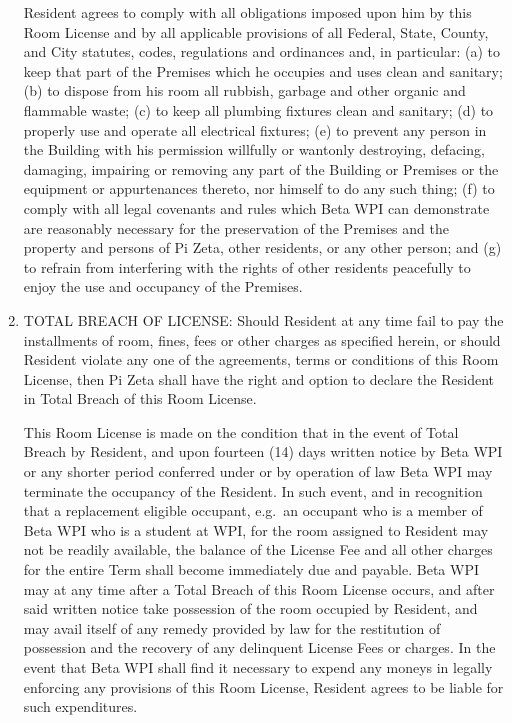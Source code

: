 \documentclass[legalpaper, 12pt]{article} \usepackage{lease}
\begin{document}
\begin{enumerate}
                Resident agrees to comply with all obligations imposed upon him
                by this Room License and by all applicable provisions of all
                Federal, State, County, and City statutes, codes, regulations
                and ordinances and, in particular: (a) to keep that part of the
                Premises which he occupies and uses clean and sanitary; (b) to
                dispose from his room all rubbish, garbage and other organic and
                flammable waste; (c) to keep all plumbing fixtures clean and
                sanitary; (d) to properly use and operate all electrical
                fixtures; (e) to prevent any person in the Building with his
                permission willfully or wantonly destroying, defacing, damaging,
                impairing or removing any part of the Building or Premises or
                the equipment or appurtenances thereto, nor himself to do any
                such thing; (f) to comply with all legal covenants and rules
                which Beta WPI can demonstrate are reasonably necessary for the
                preservation of the Premises and the property and persons of Pi
                Zeta, other residents, or any other person; and (g) to refrain
                from interfering with the rights of other residents peacefully
                to enjoy the use and occupancy of the Premises.  

        \item TOTAL BREACH OF LICENSE:  Should Resident at any time fail to pay
                the installments of room, fines, fees or other charges as
                specified herein, or should Resident violate any one of the
                agreements, terms or conditions of this Room License, then Pi
                Zeta shall have the right and option to declare the Resident in
                Total Breach of this Room License.

                This Room License is made on the condition that in the event of
                Total Breach by Resident, and upon fourteen (14) days written
                notice by Beta WPI or any shorter period conferred under or by
                operation of law Beta WPI may terminate the occupancy of the
                Resident.  In such event, and in recognition that a replacement
                eligible occupant, e.g.\ an occupant who is a member of Beta WPI
                who is a student at WPI, for the room assigned to Resident may
                not be readily available, the balance of the License Fee and all
                other charges for the entire Term shall become immediately due
                and payable.  Beta WPI may at any time after a Total Breach of
                this Room License occurs, and after said written notice take
                possession of the room occupied by Resident, and may avail
                itself of any remedy provided by law for the restitution of
                possession and the recovery of any delinquent License Fees or
                charges.  In the event that Beta WPI shall find it necessary to
                expend any moneys in legally enforcing any provisions of this
                Room License, Resident agrees to be liable for such
                expenditures.


\end{enumerate}
\end{document}
